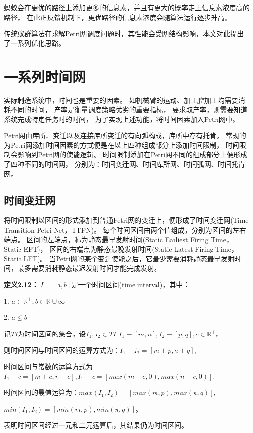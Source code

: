             蚂蚁会在更优的路径上添加更多的信息素，并且有更大的概率走上信息素浓度高的路径。
            在此正反馈机制下，更优路径的信息素浓度会随算法运行逐步升高。

            传统蚁群算法在求解Petri网调度问题时，其性能会受网结构影响，本文对此提出了一系列优化思路。
\section{一系列时间网}
实际制造系统中，时间也是重要的因素。
如机械臂的运动、加工腔加工均需要消耗不同的时间，
产率是衡量调度策略优劣的重要指标，
要求取产率，则需要知道系统完成特定任务时的时间，
为了实现上述功能，将时间因素加入Petri网中。

Petri网由库所、变迁以及连接库所变迁的有向弧构成，库所中存有托肯。
常规的为Petri网添加时间因素的方式便是在以上四种组成部分上添加时间限制，
时间限制会影响到Petri网的使能逻辑。
时间限制添加在Petri网不同的组成部分上便形成了四种不同的时间网，
分别为：时间变迁网、时间库所网、时间弧网、时间托肯网。
    \subsection{时间变迁网}
    将时间限制以区间的形式添加到普通Petri网的变迁上，便形成了时间变迁网(Time Transition Petri Net，TTPN)。
    每个时间区间由两个值组成，分别为区间的左右端点。
    区间的左端点，称为静态最早发射时间(Static Earliest Firing Time，Static EFT)，
    区间的右端点为静态最晚发射时间(Static Latest Firing Time，Static LFT)。
    当Petri网的某个变迁使能之后，它最少需要消耗静态最早发射时间，最多需要消耗静态最迟发射时间才能完成发射。

    \textbf{定义2.12}\cite{2013Time}\textbf{：}
    $I=[a,b]$是一个时间区间(time interval)，其中：

    1. $a\in\mathbb{R}^{+},b\in\mathbb{R}\cup\infty$

    2. $a \le b$

    记$TI$为时间区间的集合，设$I_{1},I_{2} \in TI,I_{1}=[m,n],I_{2}=[p,q],c \in \mathbb{R}^{+}$，

    则时间区间与时间区间的运算方式为：$I_{1}+I_{2}=[m+p,n+q]$,

    时间区间与常数的运算方式为$I_{1}+c=[m+c,n+c],I_{1}-c=[max(m-c,0),max(n-c,0)]$,

    时间区间的最值运算为：$max(I_{1},I_{2})=[max(m,p),max(n,q)]$,
    
    $min(I_{1},I_{2})=[min(m,p),min(n,q)]$。

    表明时间区间经过一元和二元运算后，其结果仍为时间区间。

